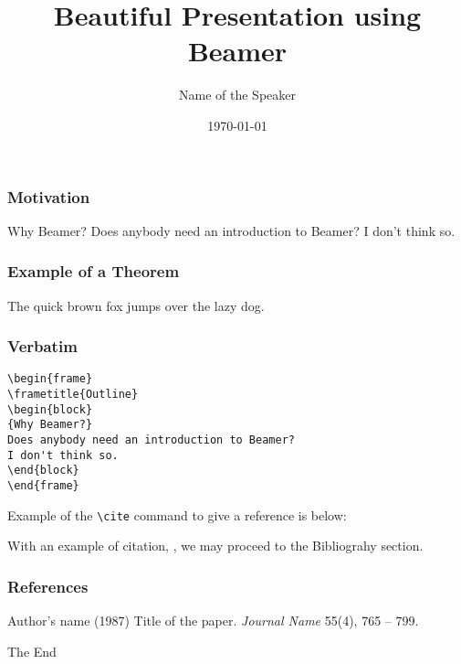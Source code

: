 \documentclass{beamer}
\title[Short title of the talk]{Beautiful Presentation using Beamer}
\author{Name of the Speaker}
\institute[U of X]
{
University of [...] \\
\medskip
{\emph{email@domain.ca}}
}
\date{\today}
\begin{document}
%
\begin{frame}
\titlepage
\end{frame}
%
%
\begin{frame}
\frametitle{Motivation}
\begin{block}
{Why Beamer?}
Does anybody need an introduction to Beamer? I don't think so.
\end{block}
\end{frame}
%
%
\begin{frame}
\frametitle{Example of a Theorem}
\begin{theorem}
The quick brown fox jumps over the lazy dog.
\end{theorem}
\end{frame}

\begin{frame}[fragile] %
\frametitle{Verbatim}
\begin{example}
\begin{verbatim}
\begin{frame}
\frametitle{Outline}
\begin{block}
{Why Beamer?}
Does anybody need an introduction to Beamer?
I don't think so.
\end{block}
\end{frame}\end{verbatim} %
\end{example}
\end{frame}

\begin{frame}[fragile]  %
Example of the \verb|\cite| command to give a reference is below:

With an example of citation, \cite{key1}, we may proceed to the Bibliograhy section.
\end{frame}

\begin{frame}
\frametitle{References}
\footnotesize{
\begin{thebibliography}{99}
  Author's name (1987)
 \newblock Title of the paper.
 \newblock \emph{Journal Name} 55(4), 765 -- 799.
\end{thebibliography}
}
\end{frame}

\begin{frame}
\centerline{The End}
\end{frame}


\end{document}
